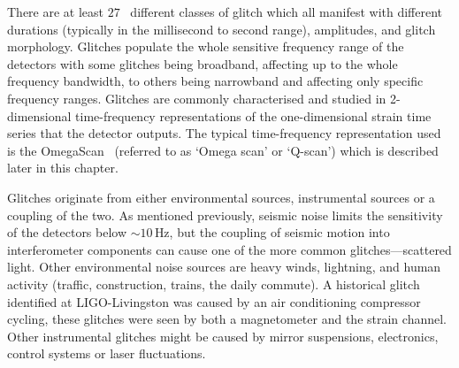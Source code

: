 
There are at least $27$~\cite{gravityspy:2023, gravityspy:2024} different classes of glitch which all manifest with different durations (typically in the millisecond to second range), amplitudes, and glitch morphology. Glitches populate the whole sensitive frequency range of the detectors with some glitches being broadband, affecting up to the whole frequency bandwidth, to others being narrowband and affecting only specific frequency ranges. Glitches are commonly characterised and studied in 2-dimensional time-frequency representations of the one-dimensional strain time series that the detector outputs. The typical time-frequency representation used is the OmegaScan~\cite{qscan:2004} (referred to as `Omega scan' or `Q-scan') which is described later in this chapter.


Glitches originate from either environmental sources, instrumental sources or a coupling of the two. As mentioned previously, seismic noise limits the sensitivity of the detectors below ${\sim}10 \, \text{Hz}$, but the coupling of seismic motion into interferometer components can cause one of the more common glitches---scattered light. Other environmental noise sources are heavy winds, lightning, and human activity (traffic, construction, trains, the daily commute). A historical glitch identified at LIGO-Livingston was caused by an air conditioning compressor cycling, these glitches were seen by both a magnetometer and the \gwadj strain channel. Other instrumental glitches might be caused by mirror suspensions, electronics, control systems or laser fluctuations.
%
%


